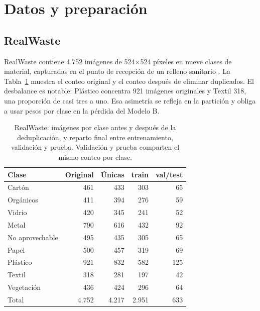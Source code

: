 \documentclass[10pt]{ieeeconf}
\begin{document}
\section{Datos y preparaci\'on}
\label{sec:datos}

\subsection{RealWaste}

RealWaste contiene 4.752 im\'agenes de 524$\times$524 p\'ixeles en nueve clases de
material, capturadas en el punto de recepci\'on de un relleno sanitario
\cite{realwasteuci}. La Tabla~\ref{tab:realwaste} muestra el conteo original y el
conteo despu\'es de eliminar duplicados. El desbalance es notable: Pl\'astico
concentra 921 im\'agenes originales y Textil 318, una proporci\'on de casi tres a
uno. Esa asimetr\'ia se refleja en la partici\'on y obliga a usar pesos por clase
en la p\'erdida del Modelo B.

\begin{table}[t]
\centering
\caption{RealWaste: im\'agenes por clase antes y despu\'es de la deduplicaci\'on,
y reparto final entre entrenamiento, validaci\'on y prueba. Validaci\'on y prueba
comparten el mismo conteo por clase.}
\label{tab:realwaste}
\footnotesize
\setlength{\tabcolsep}{3.5pt}
\begin{tabular}{@{}lrrrr@{}}
\toprule
Clase & Original & \'Unicas & train & val/test \\
\midrule
Cart\'on            & 461 & 433 & 303 & 65 \\
Org\'anicos         & 411 & 394 & 276 & 59 \\
Vidrio              & 420 & 345 & 241 & 52 \\
Metal               & 790 & 616 & 432 & 92 \\
No aprovechable     & 495 & 435 & 305 & 65 \\
Papel               & 500 & 457 & 319 & 69 \\
Pl\'astico          & 921 & 832 & 582 & 125 \\
Textil              & 318 & 281 & 197 & 42 \\
Vegetaci\'on        & 436 & 424 & 296 & 64 \\
\midrule
Total               & 4.752 & 4.217 & 2.951 & 633 \\
\bottomrule
\end{tabular}
\end{table}
\end{document}
